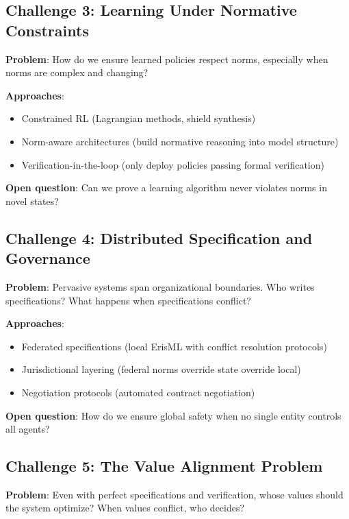 \documentclass[conference]{IEEEtran}
\begin{document}
\subsection{Challenge 3: Learning Under Normative Constraints}

\textbf{Problem}: How do we ensure learned policies respect norms,
especially when norms are complex and changing?

\textbf{Approaches}:
\begin{itemize}
\item Constrained RL (Lagrangian methods, shield synthesis)
\item Norm-aware architectures (build normative reasoning into model structure)
\item Verification-in-the-loop (only deploy policies passing formal verification)
\end{itemize}

\textbf{Open question}: Can we prove a learning algorithm never violates
norms in novel states?

\subsection{Challenge 4: Distributed Specification and Governance}

\textbf{Problem}: Pervasive systems span organizational boundaries. Who
writes specifications? What happens when specifications conflict?

\textbf{Approaches}:
\begin{itemize}
\item Federated specifications (local ErisML with conflict resolution protocols)
\item Jurisdictional layering (federal norms override state override local)
\item Negotiation protocols (automated contract negotiation)
\end{itemize}

\textbf{Open question}: How do we ensure global safety when no single
entity controls all agents?

\subsection{Challenge 5: The Value Alignment Problem}

\textbf{Problem}: Even with perfect specifications and verification,
whose values should the system optimize? When values conflict, who
decides?
\end{document}
